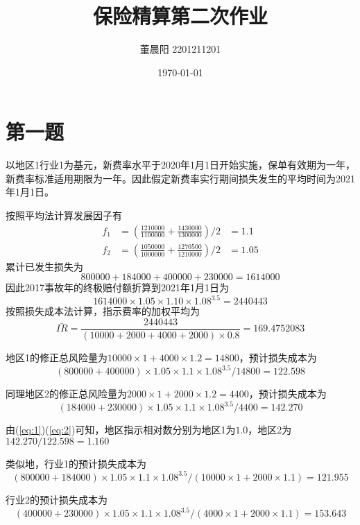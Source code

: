 \documentclass[a4paper,12pt]{ctexart}
\title{保险精算第二次作业}
\author{董晨阳 2201211201}
\date{\today}
\begin{document}
\maketitle
\section{第一题}
以地区1行业1为基元，新费率水平于2020年1月1日开始实施，保单有效期为一年，新费率标准适用期限为一年。因此假定新费率实行期间损失发生的平均时间为2021年1月1日。

按照平均法计算发展因子有
\begin{eqnarray*}
    f_1&=(\frac{1210000}{1100000}+\frac{1430000}{1300000})/2&=1.1 \\
    f_2&=(\frac{1050000}{1000000}+\frac{1270500}{1210000})/2&=1.05
\end{eqnarray*}
累计已发生损失为
$$800000+184000+400000+230000 = 1614000$$
因此2017事故年的终极赔付额折算到2021年1月1日为
$$1614000 \times 1.05 \times 1.10\times 1.08^{3.5} = 2440443$$
按照损失成本法计算，指示费率的加权平均为
\begin{equation}
    \bar{IR}=\frac{2440443}{(10000+2000+4000+2000)\times 0.8} = 169.4752083\label{eq:ir}
\end{equation}

地区1的修正总风险量为$10000\times 1+4000\times 1.2=14800$，预计损失成本为
\begin{equation}\label{eq:1}
    (800000+400000)\times 1.05\times 1.1\times 1.08^{3.5} / 14800 = 122.598
\end{equation}

同理地区2的修正总风险量为$2000\times 1+2000\times 1.2=4400$，预计损失成本为
\begin{equation}\label{eq:2}
    (184000+230000)\times 1.05\times 1.1\times 1.08^{3.5} / 4400 = 142.270
\end{equation}

由(\ref{eq:1})(\ref{eq:2})可知，地区指示相对数分别为地区1为$1.0$，地区2为$142.270/122.598 = 1.160$

类似地，行业1的预计损失成本为
\begin{equation}\label{eq:3}
    (800000+184000)\times 1.05\times 1.1\times 1.08^{3.5}/(10000\times 1+2000\times 1.1) = 121.955
\end{equation}

行业2的预计损失成本为
\begin{equation}\label{eq:4}
    (400000+230000)\times 1.05\times 1.1\times 1.08^{3.5}/(4000\times 1+2000\times 1.1) = 153.643
\end{equation}
\end{document}

